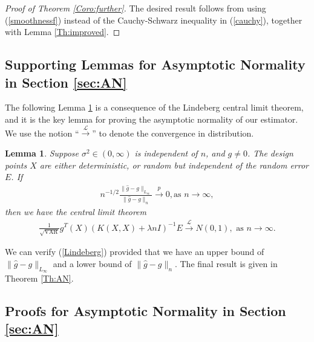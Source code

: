 \documentclass[12pt]{article}
\theoremstyle{plain}
\newtheorem{lemma}{Lemma}
\theoremstyle{remark}
\begin{document}
\begin{proof}[Proof of Theorem \ref{Coro:further}]
    The desired result follows from
using (\ref{smoothnessf}) instead of the Cauchy-Schwarz inequality in (\ref{cauchy}), together with Lemma \ref{Th:improved}.
\end{proof}



 \subsection{Supporting Lemmas for Asymptotic Normality in Section \ref{sec:AN}} 

The following Lemma \ref{lemma:CLT} is a consequence of the Lindeberg central limit theorem, and it is the key lemma for proving the asymptotic normality of our estimator. We use the notion ``$\xrightarrow{\mathscr{L}}$'' to denote the convergence in distribution.

\begin{lemma}\label{lemma:CLT}
Suppose $\sigma^2\in(0,\infty)$ is independent of $n$, and $g\neq 0$. The design points $X$ are either deterministic, or random but independent of the random error $E$.
    If
    \begin{eqnarray}\label{Lindeberg}
        n^{-1/2}\frac{\|\hat{g}-g\|_{L_\infty}}{\|\hat{g}-g\|_n}\xrightarrow{p} 0, \text{as } n\rightarrow\infty,
    \end{eqnarray}
   then we have the central limit theorem
   \begin{eqnarray}%
       \frac{1}{\sqrt{\operatorname{VAR}}}g^T(X)(K(X,X)+\lambda n I)^{-1}E\xrightarrow{\mathscr{L}} N(0,1),  \text{ as } n\rightarrow\infty.
   \end{eqnarray}
\end{lemma}

We can verify (\ref{Lindeberg}) provided that we have an upper bound of $\|\hat{g}-g\|_{L_\infty}$ and a lower bound of $\|\hat{g}-g\|_n$.
The final result is given in Theorem \ref{Th:AN}.


    \subsection{Proofs for Asymptotic Normality in Section \ref{sec:AN}} \label{sub:normlity}
\end{document}
